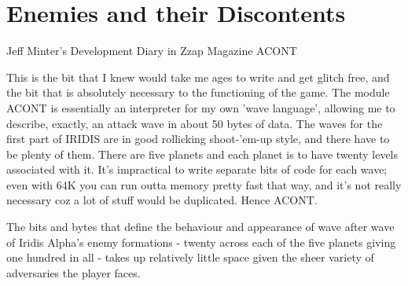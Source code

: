 \chapter{Enemies and their Discontents} 
\label{sec:level}

\lstset{style=6502Style}

\begin{q}{Jeff Minter's Development Diary in Zzap Magazine\cite{planner}}
ACONT 

This is the bit that I knew would take me ages to write and get glitch
free, and the bit that is absolutely necessary to the functioning of the game.
The module ACONT is essentially an interpreter for my own 'wave language',
allowing me to describe, exactly, an attack wave in about 50 bytes of data. The
waves for the first part of IRIDIS are in good rollicking shoot-'em-up style,
and there have to be plenty of them. There are five planets and each planet is
to have twenty levels associated with it. It's impractical to write separate
bits of code for each wave; even with 64K you can run outta memory pretty fast
that way, and it's not really necessary coz a lot of stuff would be duplicated.
Hence ACONT.

\end{q}

The bits and bytes that define the behaviour and appearance of
wave after wave of Iridis Alpha's enemy formations - twenty across each of the
five planets giving one hundred in all - takes up relatively little space given
the sheer variety of adversaries the player faces.


